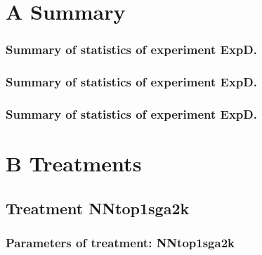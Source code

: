 \documentclass[18pt,c]{beamer}
\makeatletter
\def\beamer@writeslidentry@miniframesoff{%
  \expandafter\beamer@ifempty\expandafter{\beamer@framestartpage}{}%
  {%
   \clearpage\beamer@notesactions%
  }
}
\newcommand*{\miniframesoff}{\let\beamer@writeslidentry=\beamer@writeslidentry@miniframesoff}
\makeatother
\begin{document}
\section{A Summary}
 \begin{frame}
 \fontsize{8pt}{9pt}\selectfont
 \frametitle{ Summary of statistics of experiment ExpD. }

 \label{ExpDStatsTable000.tex}  
 \end{frame}

 \begin{frame}
 \fontsize{8pt}{9pt}\selectfont
 \frametitle{ Summary of statistics of experiment ExpD. }

 \label{ExpDStatsTable001.tex}  
 \end{frame}

 \begin{frame}
 \fontsize{8pt}{9pt}\selectfont
 \frametitle{ Summary of statistics of experiment ExpD. }

 \label{ExpDStatsTable002.tex}  
 \end{frame}

\miniframesoff
\section{B Treatments}
\miniframesoff
\subsection{Treatment NNtop1sga2k}

 \begin{frame}
 \fontsize{8pt}{9pt}\selectfont
 \frametitle{  Parameters of treatment: NNtop1sga2k 
 }

 \label{ExpDtParmTable000.tex}  
 \end{frame}

\end{document}

